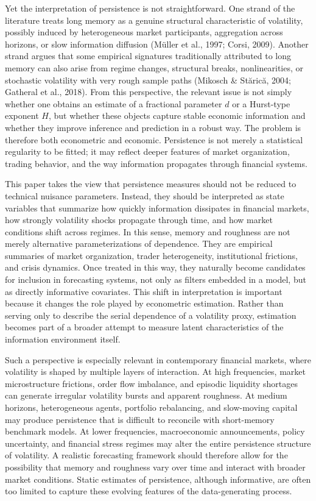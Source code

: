\documentclass[12pt]{article}
\begin{document}
Yet the interpretation of persistence is not straightforward. One strand of the literature treats long memory as a genuine structural characteristic of volatility, possibly induced by heterogeneous market participants, aggregation across horizons, or slow information diffusion (M\"uller et al., 1997; Corsi, 2009). Another strand argues that some empirical signatures traditionally attributed to long memory can also arise from regime changes, structural breaks, nonlinearities, or stochastic volatility with very rough sample paths (Mikosch \& St\u{a}ric\u{a}, 2004; Gatheral et al., 2018). From this perspective, the relevant issue is not simply whether one obtains an estimate of a fractional parameter $d$ or a Hurst-type exponent $H$, but whether these objects capture stable economic information and whether they improve inference and prediction in a robust way. The problem is therefore both econometric and economic. Persistence is not merely a statistical regularity to be fitted; it may reflect deeper features of market organization, trading behavior, and the way information propagates through financial systems.

This paper takes the view that persistence measures should not be reduced to technical nuisance parameters. Instead, they should be interpreted as state variables that summarize how quickly information dissipates in financial markets, how strongly volatility shocks propagate through time, and how market conditions shift across regimes. In this sense, memory and roughness are not merely alternative parameterizations of dependence. They are empirical summaries of market organization, trader heterogeneity, institutional frictions, and crisis dynamics. Once treated in this way, they naturally become candidates for inclusion in forecasting systems, not only as filters embedded in a model, but as directly informative covariates. This shift in interpretation is important because it changes the role played by econometric estimation. Rather than serving only to describe the serial dependence of a volatility proxy, estimation becomes part of a broader attempt to measure latent characteristics of the information environment itself.

Such a perspective is especially relevant in contemporary financial markets, where volatility is shaped by multiple layers of interaction. At high frequencies, market microstructure frictions, order flow imbalance, and episodic liquidity shortages can generate irregular volatility bursts and apparent roughness. At medium horizons, heterogeneous agents, portfolio rebalancing, and slow-moving capital may produce persistence that is difficult to reconcile with short-memory benchmark models. At lower frequencies, macroeconomic announcements, policy uncertainty, and financial stress regimes may alter the entire persistence structure of volatility. A realistic forecasting framework should therefore allow for the possibility that memory and roughness vary over time and interact with broader market conditions. Static estimates of persistence, although informative, are often too limited to capture these evolving features of the data-generating process.
\end{document}
